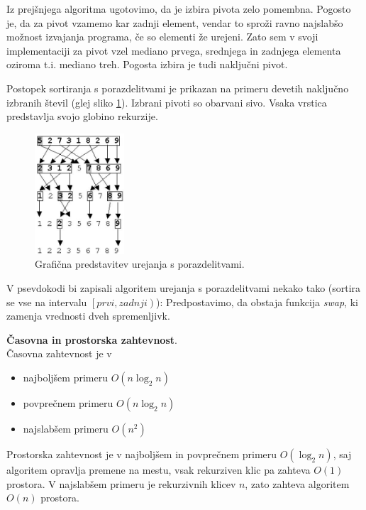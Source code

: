 \documentclass[a4paper,oneside]{article}
\begin{document}
Iz prejšnjega algoritma ugotovimo, da je izbira pivota zelo
pomembna. Pogosto je, da za pivot vzamemo kar zadnji element, vendar to sproži ravno
najslabšo možnost izvajanja programa, če so elementi že urejeni. Zato sem v svoji
implementaciji za pivot vzel mediano prvega, srednjega in zadnjega elementa oziroma t.i.
mediano treh. Pogosta izbira je tudi naključni pivot. 

Postopek sortiranja s porazdelitvami je prikazan na primeru devetih naključno
izbranih števil (glej sliko \ref{fig:quicksortimage}). Izbrani pivoti so obarvani sivo.
Vsaka vrstica predstavlja svojo globino rekurzije.


\begin{figure}[h]
    \begin{center}
        \includegraphics[height=45mm]{slike/quicksort.jpg}
    \end{center}
    \vspace{-0.7cm}
    \caption{Grafična predstavitev urejanja s porazdelitvami.}
    \label{fig:quicksortimage}
\end{figure}

V psevdokodi bi zapisali algoritem urejanja s porazdelitvami
nekako tako (sortira se vse na intervalu
$\left[prvi, zadnji\right)$):
Predpostavimo, da obstaja funkcija \emph{swap}, ki zamenja vrednosti dveh spremenljivk.



\textbf{Časovna in prostorska zahtevnost}. \\
Časovna zahtevnost je v 
\begin{itemize}
  \item najboljšem primeru $O(n\log_2 n)$
  \item povprečnem primeru $O(n\log_2 n)$
  \item najslabšem primeru $O(n^2)$
\end{itemize}

Prostorska zahtevnost je v najboljšem in povprečnem primeru $O(\log_2 n)$, 
saj algoritem opravlja premene na mestu, vsak rekurziven klic pa zahteva $O(1)$ prostora.
V najslabšem primeru je rekurzivnih klicev $n$, zato zahteva algoritem $O(n)$ prostora.
\end{document}
